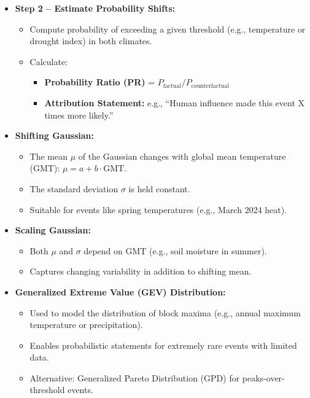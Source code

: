 \documentclass[fontsize=8pt, a4paper, landscape, fleqn]{scrartcl}
\begin{document}
\begin{multicols*}{3}[\raggedcolumns]
\begin{itemize}
    \item \textbf{Step 2 – Estimate Probability Shifts:}
    \begin{itemize}
        \item Compute probability of exceeding a given threshold (e.g., temperature or drought index) in both climates.
        \item Calculate:
        \begin{itemize}
            \item \textbf{Probability Ratio (PR)} = $P_\text{factual} / P_\text{counterfactual}$
            \item \textbf{Attribution Statement:} e.g., “Human influence made this event X times more likely.”
        \end{itemize}
    \end{itemize}

    \item \textbf{Shifting Gaussian:}
    \begin{itemize}
        \item The mean $\mu$ of the Gaussian changes with global mean temperature (GMT): $\mu = a + b \cdot \text{GMT}$.
        \item The standard deviation $\sigma$ is held constant.
        \item Suitable for events like spring temperatures (e.g., March 2024 heat).
    \end{itemize}

    \item \textbf{Scaling Gaussian:}
    \begin{itemize}
        \item Both $\mu$ and $\sigma$ depend on GMT (e.g., soil moisture in summer).
        \item Captures changing variability in addition to shifting mean.
    \end{itemize}

    \item \textbf{Generalized Extreme Value (GEV) Distribution:}
    \begin{itemize}
        \item Used to model the distribution of block maxima (e.g., annual maximum temperature or precipitation).
        \item Enables probabilistic statements for extremely rare events with limited data.
        \item Alternative: Generalized Pareto Distribution (GPD) for peaks-over-threshold events.
    \end{itemize}


\end{itemize}
\end{multicols*}
\end{document}
